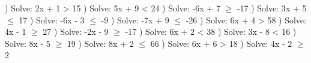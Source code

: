 \documentclass{article}%
\begin{document}
) Solve: 2x + 1 > 15%
\newline%
\newline%
) Solve: 5x + 9 < 24%
\newline%
\newline%
) Solve: -6x + 7 $\geq$ -17%
\newline%
\newline%
) Solve: 3x + 5 $\leq$ 17%
\newline%
\newline%
) Solve: -6x - 3 $\leq$ -9%
\newline%
\newline%
) Solve: -7x + 9 $\leq$ -26%
\newline%
\newline%
) Solve: 6x + 4 > 58%
\newline%
\newline%
) Solve: 4x - 1 $\geq$ 27%
\newline%
\newline%
) Solve: -2x - 9 $\geq$ -17%
\newline%
\newline%
) Solve: 6x + 2 < 38%
\newline%
\newline%
) Solve: 3x - 8 < 16%
\newline%
\newline%
) Solve: 8x - 5 $\geq$ 19%
\newline%
\newline%
) Solve: 8x + 2 $\leq$ 66%
\newline%
\newline%
) Solve: 6x + 6 > 18%
\newline%
\newline%
) Solve: 4x - 2 $\geq$ 2%
\newline%
\end{document}
